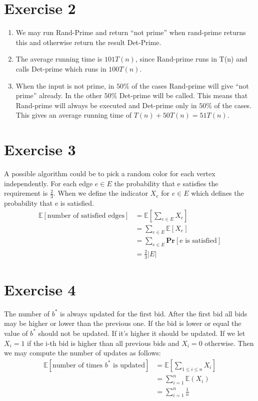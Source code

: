 \documentclass{article}
\begin{document}
\section*{Exercise 2}
\begin{enumerate}
  \item We may run Rand-Prime and return ``not prime'' when rand-prime returns this and otherwise return the result Det-Prime.
  \item The average running time is $101 T(n)$, since Rand-prime runs in T(n) and calls Det-prime which runs in $100T(n)$.
  \item When the input is not prime, in $50\%$ of the cases Rand-prime will give ``not prime'' already. In the other $50\%$ Det-prime will be called. This means that Rand-prime will always be executed and Det-prime only in $50\%$ of the cases. This gives an average running time of $T(n) + 50T(n) = 51 T(n)$.
\end{enumerate}

\section*{Exercise 3}
A possible algorithm could be to pick a random color for each vertex independently. For each edge $e \in E$ the probability that e satisfies the requirement is $\frac{2}{3}$. When we define the indicator $X_e$ for $e \in E$ which defines the probability that e is satisfied.
\begin{align*}
  \mathbb{E}[\text{number of satisfied edges}] &= \mathbb{E}\left[\sum_{e \in E}X_e\right] \\
    &= \sum_{e \in E} \mathbb{E}[X_e] \\
    &= \sum_{e \in E} \textbf{Pr} [\text{e is satisfied}] \\
    &= \frac{2}{3}|E|
\end{align*}

\section*{Exercise 4}
The number of $b^*$ is always updated for the first bid. After the first bid all bids may be higher or lower than the previous one. If the bid is lower or equal the value of $b^*$ should not be updated. If it's higher it should be updated. If we let $X_i = 1$ if the i-th bid is higher than all previous bids and $X_i = 0$ otherwise. Then we may compute the number of updates as follows:
\begin{align*}
  \mathbb{E}[\text{number of times $b^*$ is updated}] &= \mathbb{E}
  \left[
  \sum_{1 \leq i \leq n} X_i
  \right] \\
  &= \sum^{n}_{i = 1} \mathbb{E}( X_i ) \\
  &= \sum^{n}_{i = 1} \frac{1}{n}
\end{align*}
\end{document}
